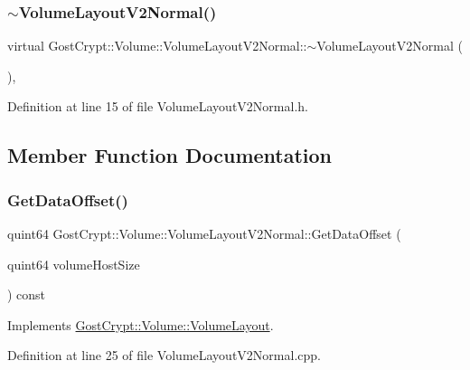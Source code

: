 \subsubsection{\texorpdfstring{$\sim$\+Volume\+Layout\+V2\+Normal()}{~VolumeLayoutV2Normal()}}
{\footnotesize\ttfamily virtual Gost\+Crypt\+::\+Volume\+::\+Volume\+Layout\+V2\+Normal\+::$\sim$\+Volume\+Layout\+V2\+Normal (\begin{DoxyParamCaption}{ }\end{DoxyParamCaption})\hspace{0.3cm}{\ttfamily [inline]}, {\ttfamily [virtual]}}



Definition at line 15 of file Volume\+Layout\+V2\+Normal.\+h.



\subsection{Member Function Documentation}
\mbox{\label{class_gost_crypt_1_1_volume_1_1_volume_layout_v2_normal_a6529ff8777f6e31f412dee79102d11b5}} 
\subsubsection{\texorpdfstring{Get\+Data\+Offset()}{GetDataOffset()}}
{\footnotesize\ttfamily quint64 Gost\+Crypt\+::\+Volume\+::\+Volume\+Layout\+V2\+Normal\+::\+Get\+Data\+Offset (\begin{DoxyParamCaption}\item[{quint64}]{volume\+Host\+Size }\end{DoxyParamCaption}) const\hspace{0.3cm}{\ttfamily [virtual]}}



Implements \hyperlink{class_gost_crypt_1_1_volume_1_1_volume_layout_a967b9498adca758a2c721bdfb102e9a9}{Gost\+Crypt\+::\+Volume\+::\+Volume\+Layout}.



Definition at line 25 of file Volume\+Layout\+V2\+Normal.\+cpp.

